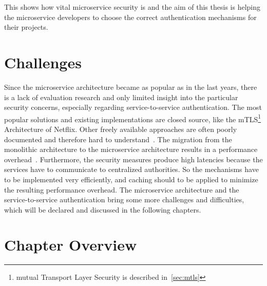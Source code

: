 This shows how vital microservice security is and the aim of this thesis is helping the microservice developers to choose the correct authentication mechanisms for their projects.

\section{Challenges}
Since the microservice architecture became as popular as in the last years, there is a lack of evaluation research and only limited insight into the particular security concerns, especially regarding service-to-service authentication. 
The most popular solutions and existing implementations are closed source, like the mTLS\footnote{mutual Transport Layer Security is described in~\ref{sec:mtls}} Architecture of Netflix.
Other freely available approaches are often poorly documented and therefore hard to understand~\cite{yarygina2018overcoming}.
The migration from the monolithic architecture to the microservice architecture results in a performance overhead~\cite{ueda2016workload}.
Furthermore, the security measures produce high latencies because the services have to communicate to centralized authorities.
So the mechanisms have to be implemented very efficiently, and caching should to be applied to minimize the resulting performance overhead.
The microservice architecture and the service-to-service authentication bring some more challenges and difficulties, which will be declared and discussed in the following chapters.

\section{Chapter Overview}

